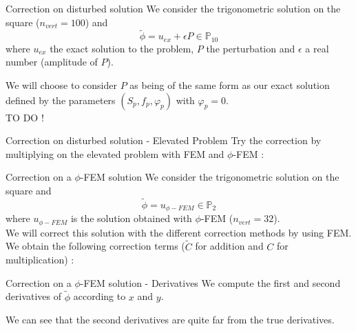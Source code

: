 \documentclass[compress,10pt,xcolor={table,dvipsnames},t]{beamer}
\begin{document}
	\begin{frame}{Correction on disturbed solution}
		We consider the trigonometric solution on the square ($n_{vert}=100$) and
		\begin{equation*}
			\tilde{\phi}=u_{ex}+\epsilon P\in\mathbb{P}_{10}
		\end{equation*}
		where $u_{ex}$ the exact solution to the problem, $P$ the perturbation and $\epsilon$ a real number (amplitude of $P$).
		
		We will choose to consider $P$ as being of the same form as our exact solution defined by the parameters $(S_p,f_p,\varphi_p)$ with $\varphi_p=0$. \\
		\color{red}TO DO !\color{black}
	\end{frame}

	\begin{frame}{Correction on disturbed solution - Elevated Problem}
		Try the correction by multiplying on the elevated problem with FEM and $\phi$-FEM :
		\begin{center}
		\end{center}
	\end{frame}

	\begin{frame}{Correction on a $\phi$-FEM solution}
		We consider the trigonometric solution on the square and
		$$\tilde{\phi}=u_{\phi-FEM}\in\mathbb{P}_{2}$$
		where $u_{\phi-FEM}$ is the solution obtained with $\phi$-FEM ($n_{vert}=32$). \\
		We will correct this solution with the different correction methods by using FEM. \\
		We obtain the following correction terms ($\tilde{C}$ for addition and $C$ for multiplication) :
		\begin{center}
		\end{center}
	\end{frame}

	\begin{frame}{Correction on a $\phi$-FEM solution - Derivatives}
		We compute the first and second derivatives of $\tilde{\phi}$ according to $x$ and $y$.
		\begin{center}
		\end{center}
		We can see that the second derivatives are quite far from the true derivatives.
	\end{frame}
\end{document}
